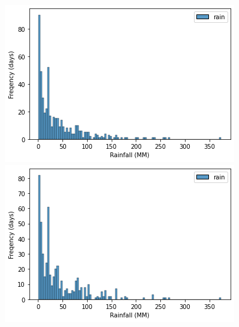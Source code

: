 \documentclass{beamer}
\begin{document}
\begin{frame}
\begin{columns}
            \includegraphics[width=0.8\linewidth]{HMM_Only/_freq_data.png}
            \includegraphics[width=0.8\linewidth]{HMM_Only/_freq_sim.png}
        \end{columns}
    \end{frame}
\end{document}
